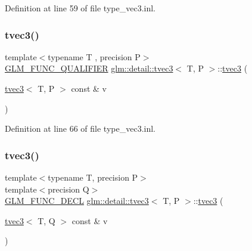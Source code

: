 Definition at line 59 of file type\+\_\+vec3.\+inl.

\mbox{\label{structglm_1_1detail_1_1tvec3_a4f0be98873dfb6134d369f817dcb9478}} 
\subsubsection{\texorpdfstring{tvec3()}{tvec3()}\hspace{0.1cm}{\footnotesize\ttfamily [2/17]}}
{\footnotesize\ttfamily template$<$typename T , precision P$>$ \\
\hyperlink{setup_8hpp_a33fdea6f91c5f834105f7415e2a64407}{G\+L\+M\+\_\+\+F\+U\+N\+C\+\_\+\+Q\+U\+A\+L\+I\+F\+I\+ER} \hyperlink{structglm_1_1detail_1_1tvec3}{glm\+::detail\+::tvec3}$<$ T, P $>$\+::\hyperlink{structglm_1_1detail_1_1tvec3}{tvec3} (\begin{DoxyParamCaption}\item[{\hyperlink{structglm_1_1detail_1_1tvec3}{tvec3}$<$ T, P $>$ const \&}]{v }\end{DoxyParamCaption})}



Definition at line 66 of file type\+\_\+vec3.\+inl.

\mbox{\label{structglm_1_1detail_1_1tvec3_ae092787775d3e74cf242744892eb3923}} 
\subsubsection{\texorpdfstring{tvec3()}{tvec3()}\hspace{0.1cm}{\footnotesize\ttfamily [3/17]}}
{\footnotesize\ttfamily template$<$typename T, precision P$>$ \\
template$<$precision Q$>$ \\
\hyperlink{setup_8hpp_ab2d052de21a70539923e9bcbf6e83a51}{G\+L\+M\+\_\+\+F\+U\+N\+C\+\_\+\+D\+E\+CL} \hyperlink{structglm_1_1detail_1_1tvec3}{glm\+::detail\+::tvec3}$<$ T, P $>$\+::\hyperlink{structglm_1_1detail_1_1tvec3}{tvec3} (\begin{DoxyParamCaption}\item[{\hyperlink{structglm_1_1detail_1_1tvec3}{tvec3}$<$ T, Q $>$ const \&}]{v }\end{DoxyParamCaption})}


